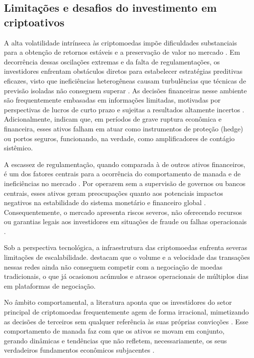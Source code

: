 \subsection{Limitações e desafios do investimento em criptoativos}
\label{subsec_limitacoes_e_desafios_do_investimento_em_criptoativos}

A alta volatilidade intrínseca às criptomoedas impõe dificuldades substanciais para a obtenção de retornos estáveis e a preservação de valor no mercado \cite{wang2020stablecoins}. Em decorrência dessas oscilações extremas e da falta de regulamentações, os investidores enfrentam obstáculos diretos para estabelecer estratégias preditivas eficazes, visto que ineficiências heterogêneas causam turbulências que técnicas de previsão isoladas não conseguem superar \cite{park2023intelligent}. As decisões financeiras nesse ambiente são frequentemente embasadas em informações limitadas, motivadas por perspectivas de lucros de curto prazo e sujeitas a resultados altamente incertos \cite{fang2022cryptocurrency}. Adicionalmente,  indicam que, em períodos de grave ruptura econômica e financeira, esses ativos falham em atuar como instrumentos de proteção (hedge) ou portos seguros, funcionando, na verdade, como amplificadores de contágio sistêmico.

A escassez de regulamentação, quando comparada à de outros ativos financeiros, é um dos fatores centrais para a ocorrência do comportamento de manada e de ineficiências no mercado \cite{park2023intelligent}. Por operarem sem a supervisão de governos ou bancos centrais, esses ativos geram preocupações quanto aos potenciais impactos negativos na estabilidade do sistema monetário e financeiro global \cite{charfeddine2020investigating}. Consequentemente, o mercado apresenta riscos severos, não oferecendo recursos ou garantias legais aos investidores em situações de fraude ou falhas operacionais \cite{charfeddine2020investigating}.

Sob a perspectiva tecnológica, a infraestrutura das criptomoedas enfrenta severas limitações de escalabilidade.  destacam que o volume e a velocidade das transações nessas redes ainda não conseguem competir com a negociação de moedas tradicionais, o que já ocasionou acúmulos e atrasos operacionais de múltiplos dias em plataformas de negociação.

No âmbito comportamental, a literatura aponta que os investidores do setor principal de criptomoedas frequentemente agem de forma irracional, mimetizando as decisões de terceiros sem qualquer referência às suas próprias convicções \cite{ballis2020herding}. Esse comportamento de manada faz com que os ativos se movam em conjunto, gerando dinâmicas e tendências que não refletem, necessariamente, os seus verdadeiros fundamentos econômicos subjacentes \cite{ballis2020herding}.

